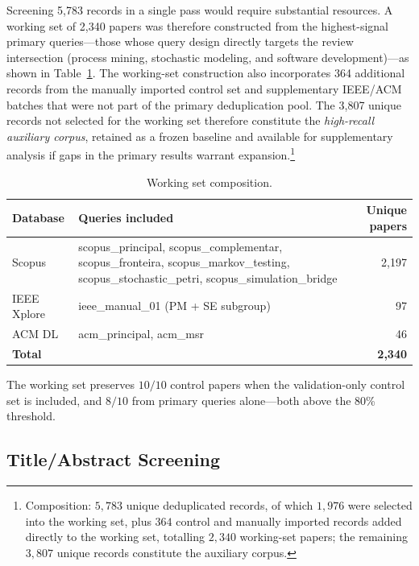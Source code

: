 Screening 5{,}783 records in a single pass would require substantial
resources. A working set of 2{,}340 papers was therefore constructed from
the highest-signal primary queries---those whose query design directly
targets the review intersection (process mining, stochastic modeling,
and software development)---as shown in Table~\ref{tab:working-set}. The
working-set construction also incorporates 364 additional records from the
manually imported control set and supplementary IEEE/ACM batches that were
not part of the primary deduplication pool. The 3{,}807 unique records not
selected for the working set therefore constitute the \textit{high-recall
auxiliary corpus}, retained as a frozen baseline and available for
supplementary analysis if gaps in the primary results warrant
expansion.\footnote{Composition: $5{,}783$ unique deduplicated records,
of which $1{,}976$ were selected into the working set, plus $364$ control
and manually imported records added directly to the working set, totalling
$2{,}340$ working-set papers; the remaining $3{,}807$ unique records
constitute the auxiliary corpus.}

\begin{table}[htbp]
\centering
\caption{Working set composition.}
\label{tab:working-set}
\small
\setlength{\tabcolsep}{4pt}
\begin{tabular}{p{2.2cm} p{8.3cm} r}
\toprule
\textbf{Database} & \textbf{Queries included} & \textbf{Unique papers} \\
\midrule
Scopus & scopus\_principal, scopus\_complementar, scopus\_fronteira,
         scopus\_markov\_testing, scopus\_stochastic\_petri,
         scopus\_simulation\_bridge & 2{,}197 \\
IEEE Xplore & ieee\_manual\_01 (PM + SE subgroup) & 97 \\
ACM DL & acm\_principal, acm\_msr & 46 \\
\midrule
\textbf{Total} & & \textbf{2{,}340} \\
\bottomrule
\end{tabular}
\end{table}

The working set preserves $10/10$ control papers when the validation-only
control set is included, and $8/10$ from primary queries alone---both above
the 80\% threshold.

\subsection{Title/Abstract Screening}

